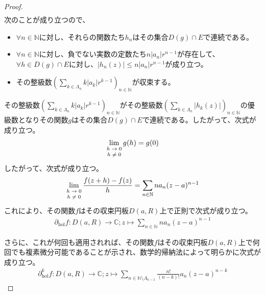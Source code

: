 \documentclass[dvipdfmx]{jsarticle}
\begin{document}
\begin{proof}
\begin{align*}
\end{align*}
次のことが成り立つので、
\begin{itemize}
\item
  $\forall n \in \mathbb{N}$に対し、それらの関数たち$h_{n}$はその集合$D(g) \cap E$で連続である。
\item
  $\forall n \in \mathbb{N}$に対し、負でない実数の定数たち$n\left| a_{n} \right|r^{n - 1}$が存在して、$\forall h \in D(g) \cap E$に対し、$\left| h_{n}(z) \right| \leq n\left| a_{n} \right|r^{n - 1}$が成り立つ。
\item
  その整級数$\left( \sum_{k \in \varLambda_{n}} {k\left| a_{k} \right|r^{k - 1}} \right)_{n \in \mathbb{N}}$が収束する。
\end{itemize}
その整級数$\left( \sum_{k \in \varLambda_{n}} {k\left| a_{k} \right|r^{k - 1}} \right)_{n \in \mathbb{N}}$がその整級数$\left( \sum_{k \in \varLambda_{n}} \left| h_{k}(z) \right| \right)_{n \in \mathbb{N}}$の優級数となりその関数$g$はその集合$D(g) \cap E$で連続である。したがって、次式が成り立つ。
\begin{align*}
\lim_{\scriptsize \begin{matrix}
h \rightarrow 0 \\
h \neq 0 \\
\end{matrix}}{g(h)} = g(0)
\end{align*}
したがって、次式が成り立つ。
\begin{align*}
\lim_{\scriptsize \begin{matrix}
h \rightarrow 0 \\
h \neq 0 \\
\end{matrix}}\frac{f(z + h) - f(z)}{h} = \sum_{n \in \mathbb{N}} {na_{n}(z - a)^{n - 1}}
\end{align*}
これにより、その関数$f$はその収束円板$D(a,R)$上で正則で次式が成り立つ。
\begin{align*}
\partial_{\mathrm{hol}}f:D(a,R) \rightarrow \mathbb{C};z \mapsto \sum_{n \in \mathbb{N}} {na_{n}(z - a)^{n - 1}}
\end{align*}\par
さらに、これが何回も適用されれば、その関数$f$はその収束円板$D(a,R)$上で何回でも複素微分可能であることが示され、数学的帰納法によって明らかに次式が成り立つ。
\begin{align*}
\partial_{\mathrm{hol}}^{k}f:D(a,R) \rightarrow \mathbb{C};z \mapsto \sum_{n \in \mathbb{N} \setminus \varLambda_{k - 1}} {\frac{n!}{(n - k)!}a_{n}(z - a)^{n - k}}
\end{align*}

\end{proof}
\end{document}
